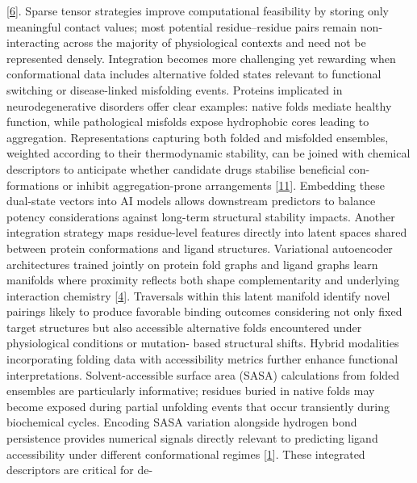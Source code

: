 \documentclass[
]{article}
\begin{document}
{[}\protect\hyperlink{_bookmark46}{6}{]}. Sparse tensor strategies
improve computational feasibility by storing only meaningful contact
values; most potential residue--residue pairs remain non-interacting
across the majority of physiological contexts and need not be
represented densely. Integration becomes more challenging yet rewarding
when conformational data includes alternative folded states relevant to
functional switching or disease-linked misfolding events. Proteins
implicated in neurodegenerative disorders offer clear examples: native
folds mediate healthy function, while pathological misfolds expose
hydrophobic cores leading to aggregation. Representations capturing both
folded and misfolded ensembles, weighted according to their
thermodynamic stability, can be joined with chemical descriptors to
anticipate whether candidate drugs stabilise beneficial con- formations
or inhibit aggregation-prone arrangements
{[}\protect\hyperlink{_bookmark51}{11}{]}. Embedding these dual-state
vectors into AI models allows downstream predictors to balance potency
considerations against long-term structural stability impacts. Another
integration strategy maps residue-level features directly into latent
spaces shared between protein conformations and ligand structures.
Variational autoencoder architectures trained jointly on protein fold
graphs and ligand graphs learn manifolds where proximity reflects both
shape complementarity and underlying interaction chemistry
{[}\protect\hyperlink{_bookmark44}{4}{]}. Traversals within this latent
manifold identify novel pairings likely to produce favorable binding
outcomes considering not only fixed target structures but also
accessible alternative folds encountered under physiological conditions
or mutation- based structural shifts. Hybrid modalities incorporating
folding data with accessibility metrics further enhance functional
interpretations. Solvent-accessible surface area (SASA) calculations
from folded ensembles are particularly informative; residues buried in
native folds may become exposed during partial unfolding events that
occur transiently during biochemical cycles. Encoding SASA variation
alongside hydrogen bond persistence provides numerical signals directly
relevant to predicting ligand accessibility under different
conformational regimes {[}\protect\hyperlink{_bookmark41}{1}{]}. These
integrated descriptors are critical for de-
\end{document}
